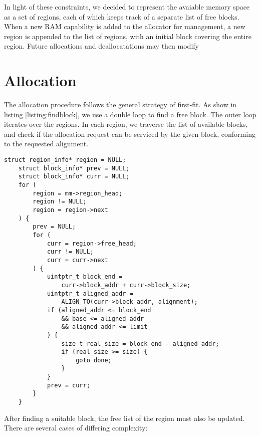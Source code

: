 In light of these constraints, we decided to represent the avaiable memory space as a set of regions, each of which keeps track of a separate list of free blocks. When a new RAM capability is added to the allocator for management, a new region is appended to the list of regions, with an initial block covering the entire region. Future allocations and deallocatations may then modify 

\section{Allocation}
The allocation procedure follows the general strategy of first-fit. As show in listing \ref{listing:findblock}, we use a double loop to find a free block. The outer loop iterates over the regions. In each region, we traverse the list of available blocks, and check if the allocation request can be serviced by the given block, conforming to the requested alignment.
\begin{lstlisting}[caption={Finding a suitable block},label={listing:findblock}]
    struct region_info* region = NULL;
    struct block_info* prev = NULL;
    struct block_info* curr = NULL;
    for (
        region = mm->region_head; 
        region != NULL; 
        region = region->next
    ) {
        prev = NULL;
        for (
            curr = region->free_head; 
            curr != NULL; 
            curr = curr->next
        ) {
            uintptr_t block_end = 
                curr->block_addr + curr->block_size;
            uintptr_t aligned_addr = 
                ALIGN_TO(curr->block_addr, alignment);
            if (aligned_addr <= block_end 
                && base <= aligned_addr 
                && aligned_addr <= limit
            ) {
                size_t real_size = block_end - aligned_addr;
                if (real_size >= size) {
                    goto done;
                }
            }
            prev = curr;
        }
    }
\end{lstlisting}

After finding a suitable block, the free list of the region must also be updated. There are several cases of differing complexity:

